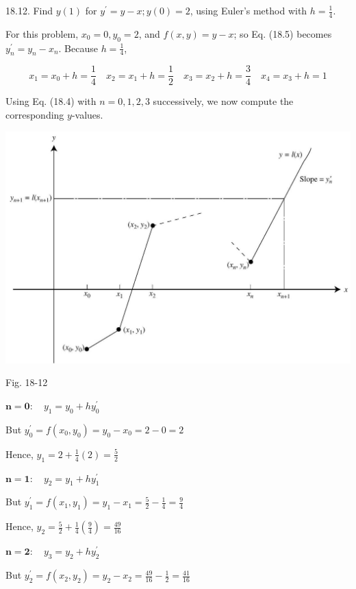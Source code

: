 \documentclass[10pt]{article}
\begin{document}
18.12. Find $y(1)$ for $y^{\prime}=y-x ; y(0)=2$, using Euler's method with $h=\frac{1}{4}$.

For this problem, $x_{0}=0, y_{0}=2$, and $f(x, y)=y-x$; so Eq. (18.5) becomes $y_{n}^{\prime}=y_{n}-x_{n}$. Because $h=\frac{1}{4}$,

$$
x_{1}=x_{0}+h=\frac{1}{4} \quad x_{2}=x_{1}+h=\frac{1}{2} \quad x_{3}=x_{2}+h=\frac{3}{4} \quad x_{4}=x_{3}+h=1
$$

Using Eq. (18.4) with $n=0,1,2,3$ successively, we now compute the corresponding $y$-values.

\begin{center}
\includegraphics[max width=\textwidth]{2024_04_03_5bb5b4275a64cb9887d1g-185}
\end{center}

Fig. 18-12

$\mathbf{n}=\mathbf{0}: \quad y_{1}=y_{0}+h y_{0}^{\prime}$

But $y_{0}^{\prime}=f\left(x_{0}, y_{0}\right)=y_{0}-x_{0}=2-0=2$

Hence, $y_{1}=2+\frac{1}{4}(2)=\frac{5}{2}$

$\mathbf{n}=\mathbf{1}: \quad y_{2}=y_{1}+h y_{1}^{\prime}$

But $y_{1}^{\prime}=f\left(x_{1}, y_{1}\right)=y_{1}-x_{1}=\frac{5}{2}-\frac{1}{4}=\frac{9}{4}$

Hence, $y_{2}=\frac{5}{2}+\frac{1}{4}\left(\frac{9}{4}\right)=\frac{49}{16}$

$\mathbf{n}=\mathbf{2}: \quad y_{3}=y_{2}+h y_{2}^{\prime}$

But $y_{2}^{\prime}=f\left(x_{2}, y_{2}\right)=y_{2}-x_{2}=\frac{49}{16}-\frac{1}{2}=\frac{41}{16}$
\end{document}
